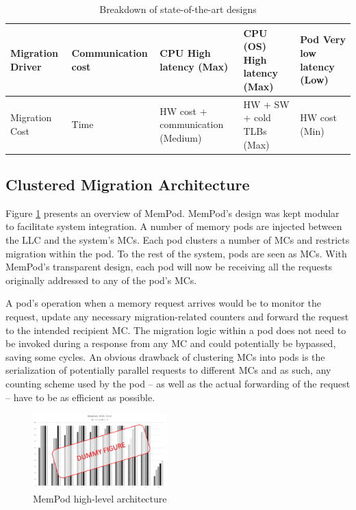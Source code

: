 \begin{table}[t]
\begin{tabularx}{\textwidth}{ |X|X|X|X|X| }
    Migration Driver & Communication cost & CPU \newline High latency \newline (Max) & CPU (OS) \newline High latency \newline (Max) & Pod \newline Very low latency \newline (Low)\\ \hline
    Migration Cost & Time & HW cost + communication \newline (Medium) & HW + SW + cold TLBs \newline (Max) & HW cost \newline (Min)\\ \hline
\end{tabularx}
  \caption{Breakdown of state-of-the-art designs}
  \label{tab:comparison}
\end{table}

\subsection{Clustered Migration Architecture}

 Figure \ref{fig:architecture_complete} presents an overview of MemPod. MemPod's design was kept modular to facilitate system integration. A number of memory pods are injected between the LLC and the system's MCs. Each pod clusters a number of MCs and restricts migration  within the pod. To the rest of the system, pods are seen as MCs. With MemPod's transparent design, each pod will now be receiving all the requests originally addressed to any of the pod's MCs. 

A pod's operation when a memory request arrives would be to monitor the request, update any necessary migration-related counters and forward the request to the intended recipient MC. The migration logic within a pod does not need to be invoked during a response from any MC and could potentially be bypassed, saving some cycles. An obvious drawback of clustering MCs into pods is the serialization of potentially parallel requests to different MCs and as such, any counting scheme used by the pod -- as well as the actual forwarding of the request -- have to be as efficient as possible. 

\begin{figure}[h]
  \includegraphics[width=0.46\textwidth]{figures/dummy.pdf}
  \caption{MemPod high-level architecture}
  \label{fig:architecture_complete}
\end{figure}

